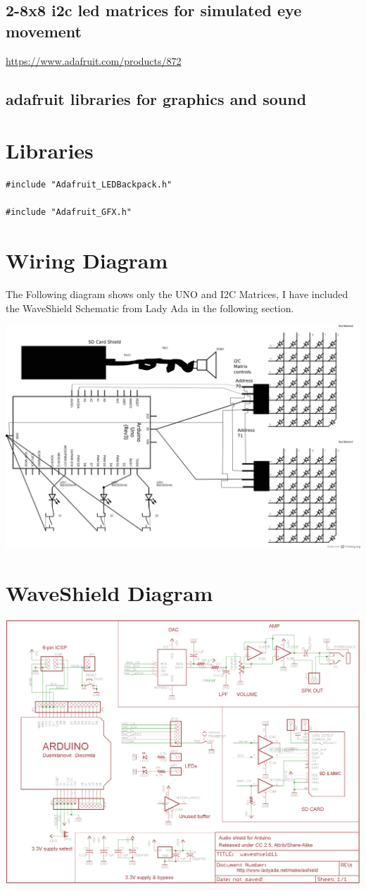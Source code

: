 \documentclass[a4paper,6pt]{article}
\begin{document}
\subsection{2-8x8 i2c led matrices for simulated eye movement}
\label{sec-2-4}
\url{https://www.adafruit.com/products/872}

\subsection{adafruit libraries for graphics and sound}
\label{sec-2-5}
\section{Libraries}
\label{sec-3}
\begin{verbatim}
#include "Adafruit_LEDBackpack.h"

#include "Adafruit_GFX.h"
\end{verbatim}

\section{Wiring Diagram}
\label{sec-4}
The Following diagram shows only the UNO and I2C Matrices, I have included the WaveShield Schematic from Lady Ada
in the following section. 

\includegraphics[angle=0,width=16cm]{./talk_a_lot_wire.png}
\section{WaveShield Diagram}
\label{sec-5}
\includegraphics[angle=0,width=16cm]{./wave11schem.png}
\end{document}

